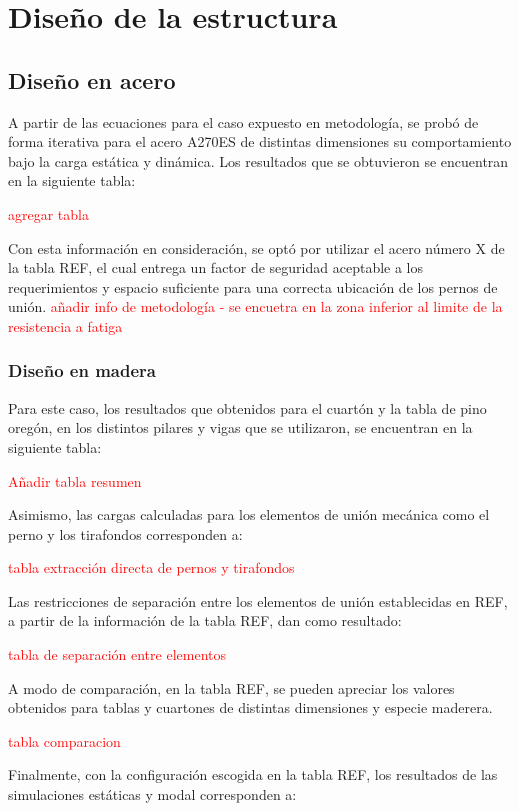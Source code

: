 \section{Diseño de la estructura}
\subsection{Diseño en acero}
A partir de las ecuaciones para el caso expuesto en metodología, se probó de forma iterativa para el acero A270ES de distintas dimensiones su comportamiento bajo la carga estática y dinámica. Los resultados que se obtuvieron se encuentran en la siguiente tabla:

\textcolor{red}{agregar tabla}

Con esta información en consideración, se optó por utilizar el acero número X de la tabla REF, el cual entrega un factor de seguridad aceptable a los requerimientos y espacio suficiente para una correcta ubicación de los pernos de unión. \textcolor{red}{añadir info de metodología - se encuetra en la zona inferior al limite de la resistencia a fatiga}

\subsubsection{Diseño en madera}
Para este caso, los resultados que obtenidos para el cuartón y la tabla de pino oregón, en los distintos pilares y vigas que se utilizaron, se encuentran en la siguiente tabla:

\textcolor{red}{Añadir tabla resumen}

Asimismo, las cargas calculadas para los elementos de unión mecánica como el perno y los tirafondos corresponden a:

\textcolor{red}{tabla extracción directa de pernos y tirafondos}

Las restricciones de separación entre los elementos de unión establecidas en REF, a partir de la información de la tabla REF, dan como resultado:

\textcolor{red}{tabla de separación entre elementos}

A modo de comparación, en la tabla REF, se pueden apreciar los valores obtenidos para tablas y cuartones de distintas dimensiones y especie maderera.

\textcolor{red}{tabla comparacion}

Finalmente, con la configuración escogida en la tabla REF, los resultados de las simulaciones estáticas y modal corresponden a:

